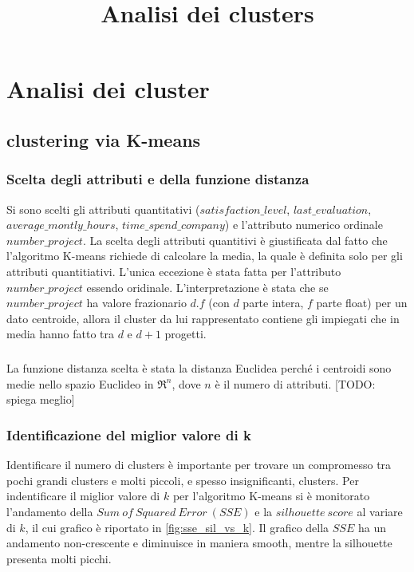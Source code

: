 \documentclass[10pt,a4paper,twocolumn]{report}
\title{Analisi dei clusters}
\begin{document}
\chapter{Analisi dei cluster}
\section{clustering via K-means}
\subsection{Scelta degli attributi e della funzione distanza}
Si sono scelti gli attributi quantitativi ($satisfaction\_level$, $last\_evaluation$, $average\_montly\_hours$, $time\_spend\_company$) e l'attributo numerico ordinale $number\_project$. 
La scelta degli attributi quantitivi è giustificata dal fatto che l'algoritmo K-means richiede di calcolare la media, la quale è definita solo per gli attributi quantitiativi. 
L'unica eccezione è stata fatta per l'attributo $number\_project$ essendo oridinale.
L'interpretazione è stata che se $number\_project$ ha valore frazionario $d.f$ (con $d$ parte intera, $f$ parte float) per un dato centroide, allora il cluster da lui rappresentato contiene gli impiegati che in media hanno fatto tra $d$ e $d+1$ progetti.
\paragraph{}
La funzione distanza scelta è stata la distanza Euclidea perché i centroidi sono medie nello spazio Euclideo in $\Re^{n}$, dove $n$ è il numero di attributi. [TODO: spiega meglio]

\subsection{Identificazione del miglior valore di k}
Identificare il numero di clusters è importante per trovare un compromesso tra pochi grandi clusters e molti piccoli, e spesso insignificanti, clusters. Per indentificare il miglior valore di $k$ per l'algoritmo K-means si è monitorato l'andamento della $Sum\ of\ Squared\ Error\ (SSE)$ e la $silhouette\ score$ al variare di $k$, il cui grafico è riportato in \autoref{fig:sse_sil_vs_k}. Il grafico della $SSE$ ha un andamento non-crescente e diminuisce in maniera smooth, mentre la silhouette presenta molti picchi.
\end{document}
